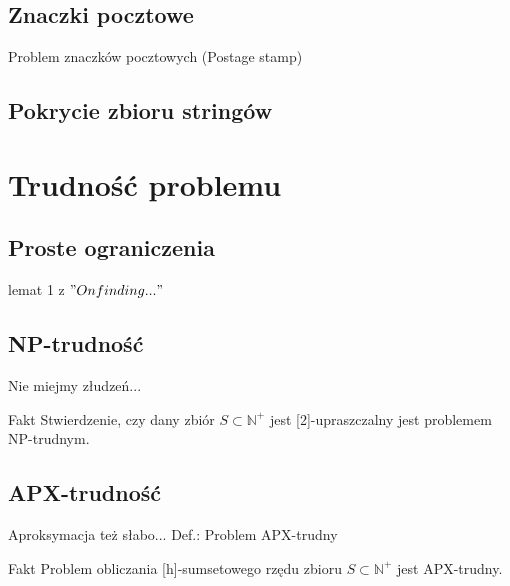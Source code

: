 \documentclass{beamer}
\newcommand{\N}{\mathbb{N}}
\begin{document}
	\subsection{Znaczki pocztowe}
		\begin{frame}
			Problem znaczków pocztowych (Postage stamp)
		\end{frame}
		
	\subsection{Pokrycie zbioru stringów}
		\begin{frame}
		\end{frame}
		
\section{Trudność problemu}
	\subsection{Proste ograniczenia}
		\begin{frame}
			lemat 1 z $"On finding..."$
		\end{frame}
		
	\subsection{NP-trudność}
		\begin{frame}{Nie miejmy złudzeń...}
			\begin{exampleblock}{Fakt}
				Stwierdzenie, czy dany zbiór $ S \subset \N^{+} $ jest [2]-upraszczalny jest problemem NP-trudnym.
			\end{exampleblock}
				
		\end{frame}
		
	\subsection{APX-trudność}
		\begin{frame}{Aproksymacja też słabo...}
			Def.: Problem APX-trudny
			
			\pause
			\begin{exampleblock}{Fakt}
				Problem obliczania [h]-sumsetowego rzędu zbioru $ S \subset \N^{+} $ jest APX-trudny.
			\end{exampleblock}
		\end{frame}
		
\end{document}
